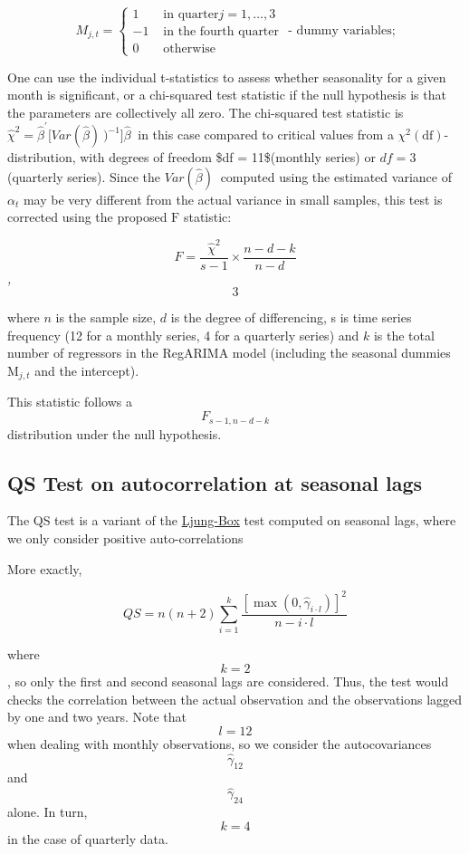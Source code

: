 \documentclass[
  letterpaper,
  DIV=11,
  numbers=noendperiod]{scrreprt}
\begin{document}
\[
M_{j,t} =
\begin{cases}
1 & \text{ in quarter} j = 1, \ldots, 3 \\
- 1 & \text{ in the fourth quarter}\\
0 & \text{ otherwise}
\end{cases} \text{ - dummy variables;}
\]

One can use the individual t-statistics to assess whether seasonality
for a given month is significant, or a chi-squared test statistic if the
null hypothesis is that the parameters are collectively all zero. The
chi-squared test statistic is
\({\widehat{\chi}}^{2} = {\widehat{\beta}}^{'}{\lbrack Var(\widehat{\beta})}^{\ })^{- 1}\rbrack{\widehat{\beta}}^{\ }\)
in this case compared to critical values from a
\(\chi^{2}\left( \text{df} \right)\)-distribution, with degrees of
freedom \$df = 11\$(monthly series) or \(df = 3\) (quarterly series).
Since the \({Var(\widehat{\beta})}^{\ }\) computed using the estimated
variance of \(\alpha_{t}\) may be very different from the actual
variance in small samples, this test is corrected using the proposed
\(\text{F}\) statistic:

\[
  F = \frac{ {\widehat{\chi}}^{2}}{s - 1} \times \frac{n - d - k}{n - d}
  \]\emph{,} \[3\]

where \(n\) is the sample size, \(d\) is the degree of differencing, s
is time series frequency (12 for a monthly series, 4 for a quarterly
series) and \(k\) is the total number of regressors in the RegARIMA
model (including the seasonal dummies \(\text{M}_{j,t}\) and the
intercept).

This statistic follows a \[F_{s - 1,n - d - k}\] distribution under the
null hypothesis.

\hypertarget{qs-test-on-autocorrelation-at-seasonal-lags}{%
\subsection{QS Test on autocorrelation at seasonal
lags}\label{qs-test-on-autocorrelation-at-seasonal-lags}}

The QS test is a variant of the
\href{../theory/Tests_LB.html}{Ljung-Box} test computed on seasonal
lags, where we only consider positive auto-correlations

More exactly,

\[ QS=n \left(n+2\right)\sum_{i=1}^k\frac{\left[ \max  \left(0, \hat\gamma_{i \cdot l}\right)\right]^2}{n-i \cdot l}\]

where \[k=2\], so only the first and second seasonal lags are
considered. Thus, the test would checks the correlation between the
actual observation and the observations lagged by one and two years.
Note that \[l=12\] when dealing with monthly observations, so we
consider the autocovariances \[\hat\gamma_{12}\] and \[\hat\gamma_{24}\]
alone. In turn, \[k=4\] in the case of quarterly data.
\end{document}
